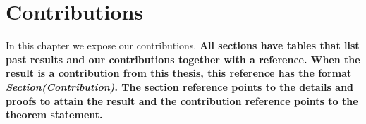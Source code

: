 \chapter{\done Contributions}

In this chapter we expose our contributions.
%
\textbf{%
All sections have tables that list
past results and our contributions together with a reference.
When the result is a
contribution from this thesis, this reference has the format
\emph{Section(Contribution)}. The section reference points to the
details and proofs to attain the result and the contribution reference
points to the theorem statement.%
}





